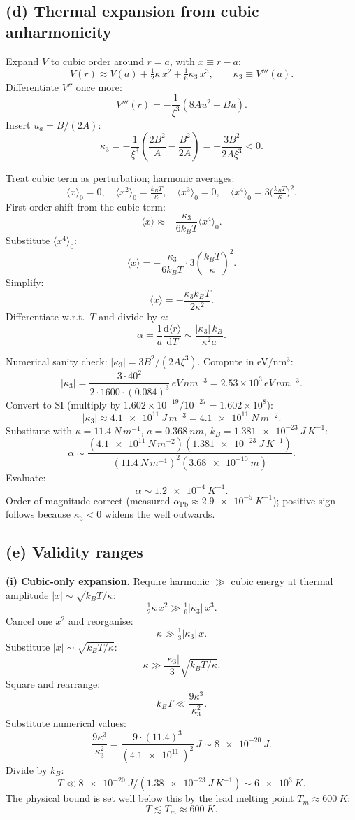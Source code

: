\documentclass[11pt]{article}
\newcommand{\de}{\mathrm{d}}
\begin{document}
\subsection*{(d) Thermal expansion from cubic anharmonicity}

Expand $V$ to cubic order around $r=a$, with $x\equiv r-a$:
\[
V(r) \approx V(a) + \tfrac12\kappa\,x^2 + \tfrac16\kappa_3\,x^3,\qquad \kappa_3 \equiv V'''(a).
\]
Differentiate $V''$ once more:
\[
V'''(r) = -\frac{1}{\xi^3}(8A u^2 - B u).
\]
Insert $u_a=B/(2A)$:
\[
\kappa_3 = -\frac{1}{\xi^3}\left(\frac{2B^2}{A} - \frac{B^2}{2A}\right) = -\frac{3B^2}{2A\xi^3} < 0.
\]

Treat cubic term as perturbation; harmonic averages:
\[
\langle x\rangle_0 = 0,\quad \langle x^2\rangle_0 = \tfrac{k_B T}{\kappa},\quad \langle x^3\rangle_0 = 0,\quad \langle x^4\rangle_0 = 3\bigl(\tfrac{k_B T}{\kappa}\bigr)^2.
\]
First-order shift from the cubic term:
\[
\langle x\rangle \approx -\frac{\kappa_3}{6 k_B T}\langle x^4\rangle_0.
\]
Substitute $\langle x^4\rangle_0$:
\[
\langle x\rangle = -\frac{\kappa_3}{6 k_B T}\cdot 3\left(\frac{k_B T}{\kappa}\right)^2.
\]
Simplify:
\[
\langle x\rangle = -\frac{\kappa_3 k_B T}{2\kappa^2}.
\]
Differentiate w.r.t.\ $T$ and divide by $a$:
\[
\boxed{\;\alpha = \frac{1}{a}\frac{\de\langle r\rangle}{\de T} \sim \frac{|\kappa_3|\,k_B}{\kappa^2 a}.\;}
\]

Numerical sanity check: $|\kappa_3| = 3B^2/(2A\xi^3)$. Compute in eV/nm$^3$:
\[
|\kappa_3| = \frac{3\cdot 40^2}{2\cdot 1600\cdot(0.084)^3}\,\si{eV\,nm^{-3}} = 2.53\times 10^{3}\,\si{eV\,nm^{-3}}.
\]
Convert to SI (multiply by $1.602\times 10^{-19}/10^{-27} = 1.602\times 10^{8}$):
\[
|\kappa_3| \approx \SI{4.1e11}{J\,m^{-3}} = \SI{4.1e11}{N\,m^{-2}}.
\]
Substitute with $\kappa=\SI{11.4}{N\,m^{-1}}$, $a=\SI{0.368}{nm}$, $k_B = \SI{1.381e-23}{J\,K^{-1}}$:
\[
\alpha \sim \frac{(\SI{4.1e11}{N\,m^{-2}})(\SI{1.381e-23}{J\,K^{-1}})}{(\SI{11.4}{N\,m^{-1}})^2(\SI{3.68e-10}{m})}.
\]
Evaluate:
\[
\alpha \sim \SI{1.2e-4}{K^{-1}}.
\]
Order-of-magnitude correct (measured $\alpha_{\text{Pb}}\approx\SI{2.9e-5}{K^{-1}}$); positive sign follows because $\kappa_3<0$ widens the well outwards.

\subsection*{(e) Validity ranges}

\textbf{(i) Cubic-only expansion.} Require harmonic $\gg$ cubic energy at thermal amplitude $|x|\sim\sqrt{k_B T/\kappa}$:
\[
\tfrac12\kappa\,x^2 \gg \tfrac16|\kappa_3|\,x^3.
\]
Cancel one $x^2$ and reorganise:
\[
\kappa \gg \tfrac{1}{3}|\kappa_3|\,x.
\]
Substitute $|x|\sim\sqrt{k_BT/\kappa}$:
\[
\kappa \gg \frac{|\kappa_3|}{3}\sqrt{k_B T/\kappa}.
\]
Square and rearrange:
\[
k_B T \ll \frac{9\kappa^3}{\kappa_3^2}.
\]
Substitute numerical values:
\[
\frac{9\kappa^3}{\kappa_3^2} = \frac{9\cdot (11.4)^3}{(\SI{4.1e11}{})^2}\,\si{J} \sim \SI{8e-20}{J}.
\]
Divide by $k_B$:
\[
T \ll \SI{8e-20}{J}/(\SI{1.38e-23}{J\,K^{-1}}) \sim \SI{6e3}{K}.
\]
The physical bound is set well below this by the lead melting point $T_m\approx\SI{600}{K}$:
\[
\boxed{\;T \lesssim T_m \approx \SI{600}{K}.\;}
\]
\end{document}

